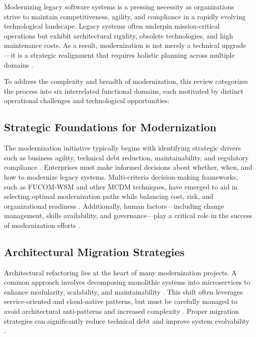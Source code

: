 \documentclass[12pt]{article}
\begin{document}
Modernizing legacy software systems is a pressing necessity as organizations strive to maintain competitiveness, agility, and compliance in a rapidly evolving technological landscape. Legacy systems often underpin mission-critical operations but exhibit architectural rigidity, obsolete technologies, and high maintenance costs. As a result, modernization is not merely a technical upgrade—it is a strategic realignment that requires holistic planning across multiple domains \cite{assuncao2025}.

To address the complexity and breadth of modernization, this review categorizes the process into six interrelated functional domains, each motivated by distinct operational challenges and technological opportunities:

\subsection{Strategic Foundations for Modernization}

The modernization initiative typically begins with identifying strategic drivers such as business agility, technical debt reduction, maintainability, and regulatory compliance \cite{assuncao2025}. Enterprises must make informed decisions about whether, when, and how to modernize legacy systems. Multi-criteria decision-making frameworks, such as FUCOM-WSM and other MCDM techniques, have emerged to aid in selecting optimal modernization paths while balancing cost, risk, and organizational readiness \cite{jomhari2024}. Additionally, human factors—including change management, skills availability, and governance—play a critical role in the success of modernization efforts \cite{ogunwole2023}.

\subsection{Architectural Migration Strategies}

Architectural refactoring lies at the heart of many modernization projects. A common approach involves decomposing monolithic systems into microservices to enhance modularity, scalability, and maintainability \cite{wolfart2021}. This shift often leverages service-oriented and cloud-native patterns, but must be carefully managed to avoid architectural anti-patterns and increased complexity \cite{lenarduzzi2020, velepucha2023}. Proper migration strategies can significantly reduce technical debt and improve system evolvability \cite{tuusjarvi2024}.
\end{document}
